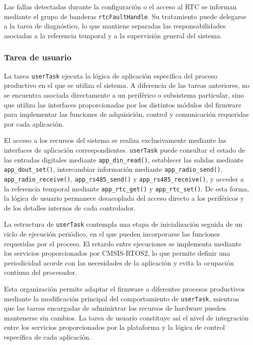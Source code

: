 Las fallas detectadas durante la configuración o el acceso al RTC se informan mediante el grupo de banderas \texttt{rtcFaultHandle}. Su tratamiento puede delegarse a la tarea de diagnóstico, lo que mantiene separadas las responsabilidades asociadas a la referencia temporal y a la supervisión general del sistema.


\subsubsection{Tarea de usuario}

La tarea \texttt{userTask} ejecuta la lógica de aplicación específica del proceso productivo en el que se utiliza el sistema. A diferencia de las tareas anteriores, no se encuentra asociada directamente a un periférico o subsistema particular, sino que utiliza las interfaces proporcionadas por los distintos módulos del firmware para implementar las funciones de adquisición, control y comunicación requeridas por cada aplicación.

El acceso a los recursos del sistema se realiza exclusivamente mediante las interfaces de aplicación correspondientes. \texttt{userTask} puede consultar el estado de las entradas digitales mediante \texttt{app\_din\_read()}, establecer las salidas mediante \texttt{app\_dout\_set()}, intercambiar información mediante \texttt{app\_radio\_send()}, \texttt{app\_radio\_receive()}, \texttt{app\_rs485\_send()} y \texttt{app\_rs485\_receive()}, y acceder a la referencia temporal mediante \texttt{app\_rtc\_get()} y \texttt{app\_rtc\_set()}. De esta forma, la lógica de usuario permanece desacoplada del acceso directo a los periféricos y de los detalles internos de cada controlador.

La estructura de \texttt{userTask} contempla una etapa de inicialización seguida de un ciclo de ejecución periódico, en el que pueden incorporarse las funciones requeridas por el proceso. El retardo entre ejecuciones se implementa mediante los servicios proporcionados por CMSIS-RTOS2, lo que permite definir una periodicidad acorde con las necesidades de la aplicación y evita la ocupación continua del procesador.

Esta organización permite adaptar el firmware a diferentes procesos productivos mediante la modificación principal del comportamiento de \texttt{userTask}, mientras que las tareas encargadas de administrar los recursos de hardware pueden mantenerse sin cambios. La tarea de usuario constituye así el nivel de integración entre los servicios proporcionados por la plataforma y la lógica de control específica de cada aplicación.


